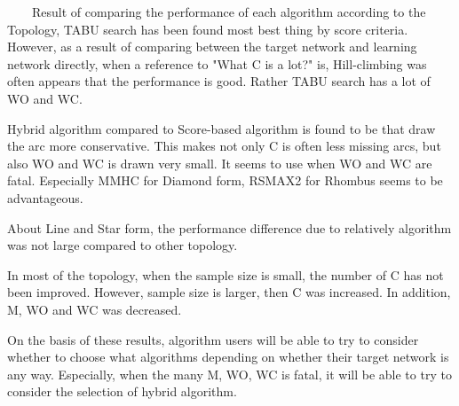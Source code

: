 ~~~~Result of comparing the performance of each algorithm according to the Topology, TABU search has been found most best thing by score criteria. However, as a result of comparing between the target network and learning network directly, when a reference to "What C is a lot?" is, Hill-climbing was often appears that the performance is good. Rather TABU search has a lot of WO and WC.

Hybrid algorithm compared to Score-based algorithm is found to be that draw the arc more conservative. This makes not only C is often less missing arcs, but also WO and WC is drawn very small. It seems to use when WO and WC are fatal. Especially MMHC for Diamond form, RSMAX2 for Rhombus seems to be advantageous.

About Line and Star form, the performance difference due to relatively algorithm was not large compared to other topology.

In most of the topology, when the sample size is small, the number of C has not been improved. However, sample size is larger, then C was increased. In addition, M, WO and WC was decreased.

On the basis of these results, algorithm users will be able to try to consider whether to choose what algorithms depending on whether their target network is any way. Especially, when the many M, WO, WC is fatal, it will be able to try to consider the selection of hybrid algorithm.


